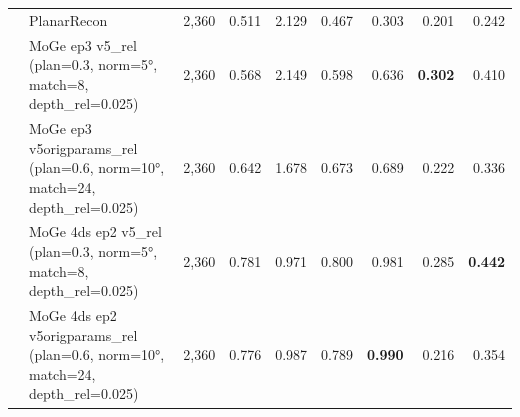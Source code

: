 \begin{table}[t]
\begin{tabular}{l l r r r r r r r}
 & PlanarRecon & 2,360 & 0.511 & 2.129 & 0.467 & 0.303 & 0.201 & 0.242 \\
 & MoGe ep3 v5\_rel (plan=0.3, norm=5°, match=8, depth\_rel=0.025) & 2,360 & 0.568 & 2.149 & 0.598 & 0.636 & \textbf{0.302} & 0.410 \\
 & MoGe ep3 v5origparams\_rel (plan=0.6, norm=10°, match=24, depth\_rel=0.025) & 2,360 & 0.642 & 1.678 & 0.673 & 0.689 & 0.222 & 0.336 \\
 & MoGe 4ds ep2 v5\_rel (plan=0.3, norm=5°, match=8, depth\_rel=0.025) & 2,360 & 0.781 & 0.971 & 0.800 & 0.981 & 0.285 & \textbf{0.442} \\
 & MoGe 4ds ep2 v5origparams\_rel (plan=0.6, norm=10°, match=24, depth\_rel=0.025) & 2,360 & 0.776 & 0.987 & 0.789 & \textbf{0.990} & 0.216 & 0.354 \\
\bottomrule
\end{tabular}
\end{table}